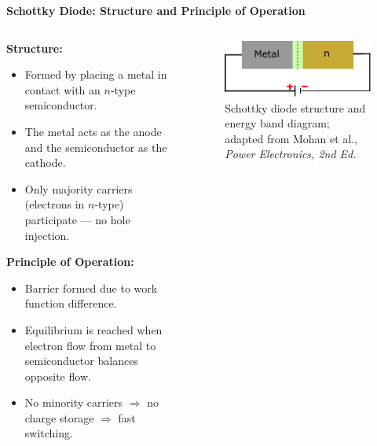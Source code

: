 \begin{frame}{\textbf{Schottky Diode: Structure and Principle of Operation}}
    \begin{columns}
        \begin{column}{0.6\textwidth}
        \textbf{Structure:}
        \begin{itemize}
            \item Formed by placing a metal in contact with an $n$-type semiconductor.
            \item The metal acts as the anode and the semiconductor as the cathode.
            \item Only majority carriers (electrons in $n$-type) participate — no hole injection.
        \end{itemize}
        
        \textbf{Principle of Operation:}
        \begin{itemize}
            \item Barrier formed due to work function difference.
            \item Equilibrium is reached when electron flow from metal to semiconductor balances opposite flow.
            \item No minority carriers $\Rightarrow$ no charge storage $\Rightarrow$ fast switching.
        \end{itemize}
    \end{column}
    \begin{column}{0.4\textwidth}
                \begin{figure}
                    \centering
                    \includegraphics[scale=1]{fig/lec04/schottky_diode.pdf}
                    \caption{Schottky diode structure and energy band diagram; adapted from Mohan et al., \textit{Power Electronics, 2nd Ed.}}
                    \label{fig:schottky_diode_structure}
                \end{figure}
    \end{column}
\end{columns}
\end{frame}


